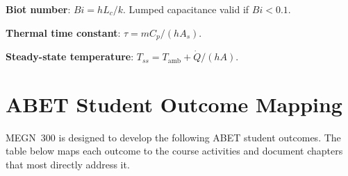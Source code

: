 \documentclass[11pt,letterpaper,twoside,openany]{book}
\begin{document}
\textbf{Biot number}: $Bi = hL_c/k$. Lumped capacitance valid if $Bi < 0.1$.

\textbf{Thermal time constant}: $\tau = mC_p/(hA_s)$.

\textbf{Steady-state temperature}: $T_{ss} = T_{\text{amb}} + \dot{Q}/(hA)$.


\chapter*{ABET Student Outcome Mapping}

MEGN~300 is designed to develop the following ABET student outcomes. The table below maps each outcome to the course activities and document chapters that most directly address it.
\end{document}
